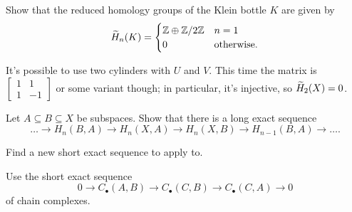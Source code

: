 \begin{sproblem}
	\gim
	Show that the reduced homology groups of the Klein bottle $K$ are given by
	\[
		\widetilde H_n(K) =
		\begin{cases}
			\mathbb Z \oplus \mathbb Z/2\mathbb Z & n = 1 \\
			0 & \text{otherwise}.
		\end{cases}
	\]
	\begin{hint}
		It's possible to use two cylinders with $U$ and $V$.
		This time the matrix is $\begin{bmatrix} 1 & 1 \\ 1 & -1 \end{bmatrix}$
		or some variant though; in particular, it's injective, so $\widetilde H_2(X) = 0$.
	\end{hint}
\end{sproblem}

\begin{sproblem}
	\label{prob:triple_long_exact}
	Let $A \subseteq B \subseteq X$ be subspaces.
	Show that there is a long exact sequence
	\[
		\dots \to H_n(B,A) \to H_n(X,A)
		\to H_n(X,B) \to H_{n-1}(B,A) \to \dots.
	\]
	\begin{hint}
		Find a new short exact sequence
		to apply  to.
	\end{hint}
	\begin{sol}
		Use the short exact sequence
		\[ 0 \to C_\bullet(A,B) \to C_\bullet(C,B) \to C_\bullet(C,A) \to 0 \]
		of chain complexes.
	\end{sol}
\end{sproblem}
